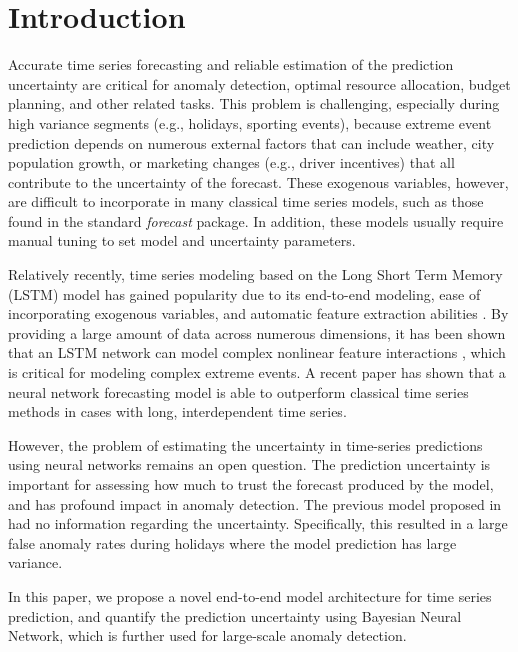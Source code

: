 \documentclass[conference,compsoc,final]{IEEEtran}
\begin{document}
\IEEEpeerreviewmaketitle




\section{Introduction}

Accurate  time series forecasting and reliable estimation of the prediction uncertainty are critical for anomaly detection, optimal resource allocation, budget planning, and other related tasks. This problem is challenging, especially during high variance segments (e.g., holidays, sporting events), because extreme event prediction depends on numerous external factors that can include weather, city population growth, or marketing changes (e.g., driver incentives) \cite{doi:10.1177/1012690204043462} that all contribute to the uncertainty of the forecast.
These exogenous variables, however, are difficult to incorporate in many classical time series models, such as those found in the standard  \textit{forecast}\cite{forecast} package. In addition, these models usually require manual tuning to set model and uncertainty parameters. 

Relatively recently, time series modeling based on the Long Short Term Memory (LSTM) model \cite{Hochreiter:1997:LSM:1246443.1246450} has gained popularity due to its end-to-end modeling, ease of incorporating exogenous variables, and automatic feature extraction abilities \cite{Assaad:2008:NBA:1297420.1297576}. By providing a large amount of data across numerous dimensions, it has been shown that an LSTM network can model complex nonlinear feature interactions \cite{DBLP:journals/corr/OgunmoluGJG16}, which is critical for modeling complex extreme events. A recent paper \cite{laptev:2017:1273496} has shown that a neural network forecasting model is able to outperform classical time series methods in cases with long, interdependent time series. 

However, the problem of estimating the uncertainty in time-series predictions using neural networks remains an open question. The prediction uncertainty is important for assessing how much to trust the forecast produced by the model, and has profound impact in anomaly detection.
The previous model proposed in \cite{laptev:2017:1273496} had no information regarding the uncertainty. Specifically, this resulted in a large false anomaly rates during holidays where the model prediction has large variance. 


In this paper, we propose a novel end-to-end model architecture for time series prediction, and quantify the prediction uncertainty using Bayesian Neural Network, which is further used for large-scale anomaly detection.
\end{document}
